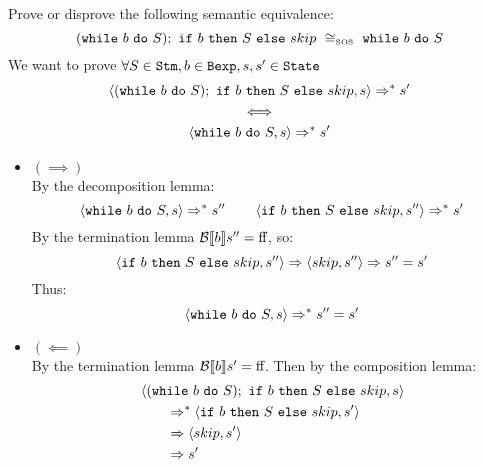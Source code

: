 \begin{exercise}{
    Prove or disprove the following semantic equivalence:
    \[ (\wwhile{b}{S});\ \wif{b}{S}{skip}\ \SOScong\ \wwhile{b}{S} \]
}
    We want to prove $\forall S \in \texttt{Stm}, b \in \texttt{Bexp}, s, s' \in \texttt{State}$
    \begin{gather*}
        \left<(\texttt{while}\ b\ \texttt{do}\ S);\ \texttt{if}\ b\ \texttt{then}\ S\ \texttt{else}\ skip, s\right> \Rightarrow^* s' \\
        \iff \\
        \left<\texttt{while}\ b\ \texttt{do}\ S, s\right> \Rightarrow^* s'
    \end{gather*}
    \begin{itemize}
        \item $(\implies)$ \vspace{0.2cm} \\
            By the decomposition lemma:\vspace*{-0.3cm}
            \[ \left<\texttt{while}\ b\ \texttt{do}\ S, s\right> \Rightarrow^* s'' \qquad \left<\texttt{if}\ b\ \texttt{then}\ S\ \texttt{else}\ skip, s''\right> \Rightarrow^* s' \]
            By the termination lemma $\mathcal{B} \llbracket b \rrbracket s'' = \text{ff}$, so:\vspace*{-0.3cm}
            \[ \left<\texttt{if}\ b\ \texttt{then}\ S\ \texttt{else}\ skip, s''\right> \Rightarrow \left<skip, s''\right> \Rightarrow s'' = s' \]
            Thus:
            \[ \left<\texttt{while}\ b\ \texttt{do}\ S, s\right> \Rightarrow^* s'' = s' \]
        \item $(\impliedby)$ \vspace{0.2cm} \\
            By the termination lemma $\mathcal{B} \llbracket b \rrbracket s' = \text{ff}$. Then by the composition lemma:\vspace*{-0.3cm}
            \begin{align*}
                &\left<(\texttt{while}\ b\ \texttt{do}\ S);\ \texttt{if}\ b\ \texttt{then}\ S\ \texttt{else}\ skip, s\right>
                \\&\qquad \Rightarrow^* \left<\texttt{if}\ b\ \texttt{then}\ S\ \texttt{else}\ skip, s'\right>
                \\&\qquad \Rightarrow \left<skip, s'\right>
                \\&\qquad \Rightarrow s'
            \end{align*}
    \end{itemize}
\end{exercise}
